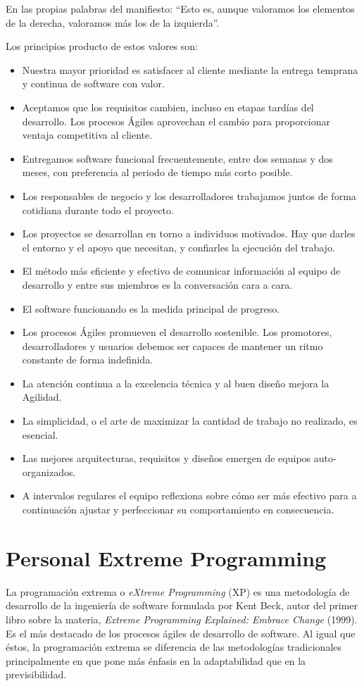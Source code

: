 En las propias palabras del manifiesto: ``Esto es, aunque valoramos los elementos de la derecha, valoramos más los de la izquierda''.\cite{agilemanifesto}

Los principios producto de estos valores son:\cite{agileprinciples}

\begin{itemize}
	\itemsep1pt \parskip1pt 
	\item Nuestra mayor prioridad es satisfacer al cliente mediante la entrega temprana y continua de software con valor.
	\item Aceptamos que los requisitos cambien, incluso en etapas tardías del desarrollo. Los procesos Ágiles aprovechan el cambio para proporcionar ventaja competitiva al	cliente.
	\item Entregamos software funcional frecuentemente, entre dos semanas y dos meses, con preferencia al periodo de tiempo más corto posible.
	\item Los responsables de negocio y los desarrolladores	trabajamos juntos de forma cotidiana durante todo el proyecto.
	\item Los proyectos se desarrollan en torno a individuos motivados. Hay que darles el entorno y el apoyo que necesitan, y confiarles la ejecución del trabajo.
	\item El método más eficiente y efectivo de comunicar información al equipo de desarrollo y entre sus miembros es la conversación cara a cara.
	\item El software funcionando es la medida principal de	progreso.
	\item Los procesos Ágiles promueven el desarrollo sostenible. Los promotores, desarrolladores y usuarios
	debemos ser capaces de mantener un ritmo constante de forma indefinida.
	\item La atención continua a la excelencia técnica y al	buen diseño mejora la Agilidad.
	\item La simplicidad, o el arte de maximizar la cantidad de	trabajo no realizado, es esencial.
	\item Las mejores arquitecturas, requisitos y diseños emergen de equipos auto-organizados.
	\item A intervalos regulares el equipo reflexiona sobre	cómo ser más efectivo para a continuación ajustar y perfeccionar su comportamiento en consecuencia.
\end{itemize}

\section{Personal Extreme Programming}
La programación extrema o \textit{eXtreme Programming} (XP) es una metodología de desarrollo de la ingeniería de software formulada por Kent Beck, autor del primer libro sobre la materia, \textit{Extreme Programming Explained: Embrace Change} (1999). Es el más destacado de los procesos ágiles de desarrollo de software. Al igual que éstos, la programación extrema se diferencia de las metodologías tradicionales principalmente en que pone más énfasis en la adaptabilidad que en la previsibilidad.

